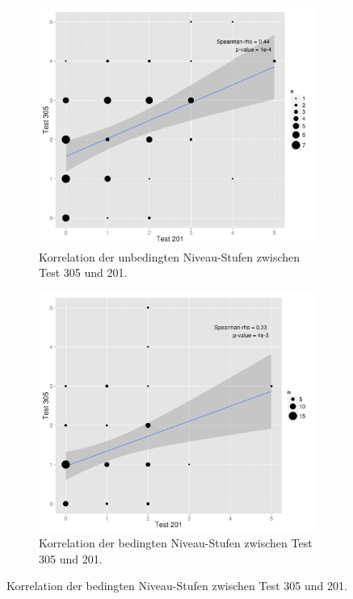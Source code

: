 \begin{figure}[htbp]
\ContinuedFloat %
\centering
\begin{subfigure}{0.49\textwidth}
  \includegraphics[width=1.0\linewidth]{graphics/cor201305u.png}
  \caption{Korrelation der unbedingten Niveau-Stufen zwischen Test 305 und 201.}
  \label{fig:cor201305k}
\end{subfigure}
\begin{subfigure}{0.49\textwidth}
  \includegraphics[width=1.0\linewidth]{graphics/cor201305k.png}
  \caption{Korrelation der bedingten Niveau-Stufen zwischen Test 305 und 201.}
  \label{fig:cor201305u}
\end{subfigure}
\end{figure}
